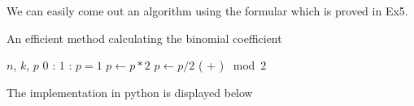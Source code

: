We can easily come out an algorithm using the formular which is proved in Ex5.
\begin{algorithm}[H]
	\caption{An efficient method calculating the binomial coefficient}
	\begin{algorithmic}[1]
		 {$n$, $k$, $p$}
				\State \Return $0$
			\EndIf
			 :
				\State \Return $1$
			\EndIf
			 :
				\State $p = 1$
					\State $p \leftarrow p * 2$
				\EndWhile
			\Else
					\State $p \leftarrow p / 2$
				\EndWhile
			\EndIf
			\State \Return ( + ) $\bmod 2$
		\EndFunction
	\end{algorithmic}
\end{algorithm}

\noindent The implementation in python is displayed below
